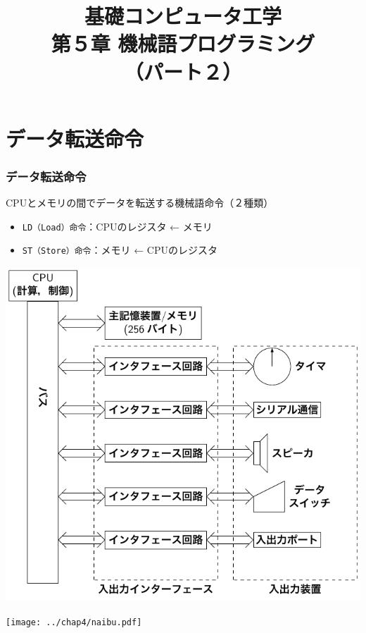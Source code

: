\documentclass{beamer}                 %
\begin{document}
\title{基礎コンピュータ工学\\第５章 機械語プログラミング\\（パート２）}
\date{}

\begin{frame}
  \titlepage
\end{frame}


\section{データ転送命令}
\begin{frame}
  \frametitle{データ転送命令}
  CPUとメモリの間でデータを転送する機械語命令（２種類）
  \begin{itemize}
  \item \texttt{LD（Load）命令}：CPUのレジスタ ← メモリ
  \item \texttt{ST（Store）命令}：メモリ ← CPUのレジスタ
  \end{itemize}
  \vfill
  \begin{minipage}{0.49\columnwidth}
  \centerline{\includegraphics[scale=0.63,clip,trim=0 3cm 3cm 0]
    {../Tikz/kousei2.pdf}}
  \end{minipage}
  \begin{minipage}{0.49\columnwidth}
  \centerline{\texttt{[image: ../chap4/naibu.pdf]}}
  \end{minipage}
\end{frame}
\end{document}
